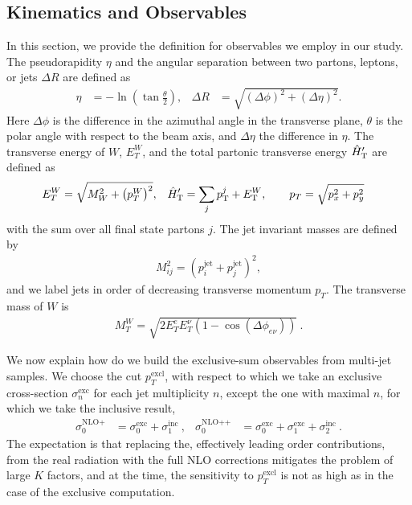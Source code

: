\subsection{Kinematics and Observables}
\label{sec:kin}
In this section, we provide the definition for observables we employ in our study.
The pseudorapidity $\eta$ and the
angular separation between two partons, leptons, or jets $\Delta R$ are defined as
\begin{align}
  \eta &= -\ln\left(\tan\frac{\theta}{2}\right),&  \Delta R &= \sqrt{(\Delta \phi)^2+(\Delta \eta)^2}.
\end{align}
Here $\Delta\phi$ is the difference in the azimuthal angle in the transverse plane,
$\theta$ is the polar angle with respect to the beam axis, and
$\Delta\eta$ the difference in $\eta$. 
The transverse energy of $W$, $E_T^W$, and the total partonic transverse energy ${\hat H}_{\mathrm T}'$ are defined as
\begin{align}\label{eq:htpart}
  E_T^W&=\sqrt{M_W^2+\left(p_T^W \right)^2},& {\hat H}_{\mathrm T}'&=\sum_j p_{\textrm T}^j+E_{\textrm T}^W, \qquad p_T=\sqrt{p_x^2+p_y^2}
\end{align}
with the sum over all final state partons $j$.
The jet invariant masses are defined by
\begin{align}
  M_{ij}^2 = \left(p_i^{\text{jet}}+p_j^{\text{jet}}\right)^2,
\end{align}
and we label  jets in order of decreasing transverse momentum $p_T$. 
The transverse mass of $W$ is
\begin{align}
  M_T^W=\sqrt{2E_T^eE_T^\nu(1-\cos(\Delta\phi_{e\nu}))}\ .
\end{align}

We now explain how do we build the exclusive-sum observables from multi-jet samples.
We choose the cut $p_{T}^{\text{excl}}$, with respect to which we take an exclusive cross-section $\sigma^{\text{exc}}_n$
for each jet multiplicity $n$, except the one with maximal  $n$, for which we take the inclusive result,
\begin{align}\label{eq:excsums}
  \sigma^{\text{NLO+}}_0 &= \sigma^{\text{exc}}_0 + \sigma^{\text{inc}}_1\ , &
\sigma^{\text{NLO++}}_0 &= \sigma^{\text{exc}}_0 +\sigma^{\text{exc}}_1+
\sigma^{\text{inc}}_2\ .
\end{align}
The expectation is that replacing the, effectively leading order contributions, from the real radiation with the full NLO
corrections mitigates the problem of large $K$ factors, and at the time, the sensitivity to $p_{T}^{\text{excl}}$ is not as high 
as in the case of the exclusive computation.

